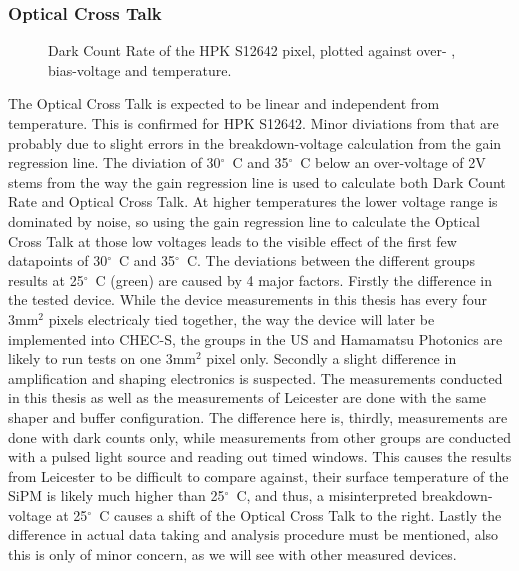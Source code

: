 \documentclass[12pt,article,type=msc,colorback,accentcolor=tud9c]{tudthesis}
\begin{document}
\subsubsection{Optical Cross Talk}
\begin{figure}[h]
\begin{centering}
\caption[CHEC-S OCT]{Dark Count Rate of the HPK S12642 pixel, plotted against over- , bias-voltage and temperature.}
\label{fig:S12642_OCT}
\end{centering}
\end{figure}
The Optical Cross Talk is expected to be linear and independent from temperature. This is confirmed for HPK S12642. Minor diviations from that are probably due to slight errors in the breakdown-voltage calculation from the gain regression line. The diviation of 30${^\circ}$~C and 35${^\circ}$~C below an over-voltage of 2V stems from the way the gain regression line is used to calculate both Dark Count Rate and Optical Cross Talk. At higher temperatures the lower voltage range is dominated by noise, so using the gain regression line to calculate the Optical Cross Talk at those low voltages leads to the visible effect of the first few datapoints of 30${^\circ}$~C and 35${^\circ}$~C. 
The deviations between the different groups results at 25${^\circ}$~C (green) are caused by 4 major factors. Firstly the difference in the tested device. While the device measurements in this thesis has every four 3mm$^2$ pixels electricaly tied together, the way the device will later be implemented into CHEC-S, the groups in the US\cite{US_CHECS} and Hamamatsu Photonics\cite{HPK_SiPM} are likely to run tests on one 3mm$^2$ pixel only. Secondly a slight difference in amplification and shaping electronics is suspected. The measurements conducted in this thesis as well as the measurements of Leicester are done with the same shaper and buffer configuration. The difference here is, thirdly, measurements are done with dark counts only, while measurements from other groups are conducted with a pulsed light source and reading out timed windows. This causes the results from Leicester to be difficult to compare against, their surface temperature of the SiPM is likely much higher than 25${^\circ}$~C, and thus, a misinterpreted breakdown-voltage at 25${^\circ}$~C causes a shift of the Optical Cross Talk to the right. Lastly the difference in actual data taking and analysis procedure must be mentioned, also this is only of minor concern, as we will see with other measured devices.
\end{document}
